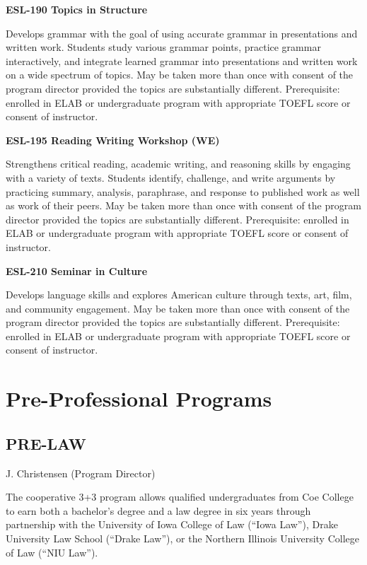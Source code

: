 \documentclass[
  letterpaper,
]{scrbook}
\begin{document}
\textbf{ESL-190 Topics in Structure}

Develops grammar with the goal of using accurate grammar in
presentations and written work. Students study various grammar points,
practice grammar interactively, and integrate learned grammar into
presentations and written work on a wide spectrum of topics. May be
taken more than once with consent of the program director provided the
topics are substantially different. Prerequisite: enrolled in ELAB or
undergraduate program with appropriate TOEFL score or consent of
instructor.

\textbf{ESL-195 Reading Writing Workshop (WE)}

Strengthens critical reading, academic writing, and reasoning skills by
engaging with a variety of texts. Students identify, challenge, and
write arguments by practicing summary, analysis, paraphrase, and
response to published work as well as work of their peers. May be taken
more than once with consent of the program director provided the topics
are substantially different. Prerequisite: enrolled in ELAB or
undergraduate program with appropriate TOEFL score or consent of
instructor.

\textbf{ESL-210 Seminar in Culture}

Develops language skills and explores American culture through texts,
art, film, and community engagement. May be taken more than once with
consent of the program director provided the topics are substantially
different. Prerequisite: enrolled in ELAB or undergraduate program with
appropriate TOEFL score or consent of instructor.

\section{Pre-Professional Programs}\label{pre-professional-programs}

\subsection{PRE-LAW}\label{pre-law}

J. Christensen (Program Director)

The cooperative 3+3 program allows qualified undergraduates from Coe
College to earn both a bachelor's degree and a law degree in six years
through partnership with the University of Iowa College of Law (``Iowa
Law''), Drake University Law School (``Drake Law''), or the Northern
Illinois University College of Law (``NIU Law'').
\end{document}
